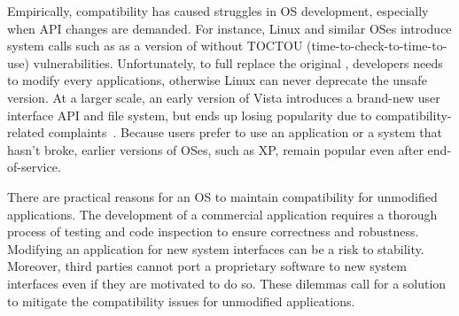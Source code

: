 Empirically, compatibility has caused struggles in OS development,
especially when API changes are demanded.
For instance, Linux and similar OSes
introduce system calls such as  as a version of 
without TOCTOU (time-to-check-to-time-to-use)
vulnerabilities.
Unfortunately,
to full replace the original , developers needs to modify every applications, otherwise Linux can never deprecate
the unsafe version.
At a larger scale, an early version of \win{} Vista introduces
a brand-new user interface API
and file system,
but ends up losing popularity due to compatibility-related complaints~\cite{spolsky04microsoft-api-war}.
Because users prefer to use an application or a system
that hasn't broke,
earlier versions of OSes, such as \win{} XP, remain popular even after end-of-service.


There are practical reasons
for an OS to maintain compatibility for unmodified applications.
The development of a commercial application
requires a thorough process of testing and code inspection to ensure correctness and robustness.
Modifying an application for new system interfaces can be a risk to stability.
Moreover, third parties cannot port a proprietary software to new system interfaces even if they are motivated to do so.
These dilemmas call for a solution
to mitigate 
the compatibility issues for 
unmodified applications.





